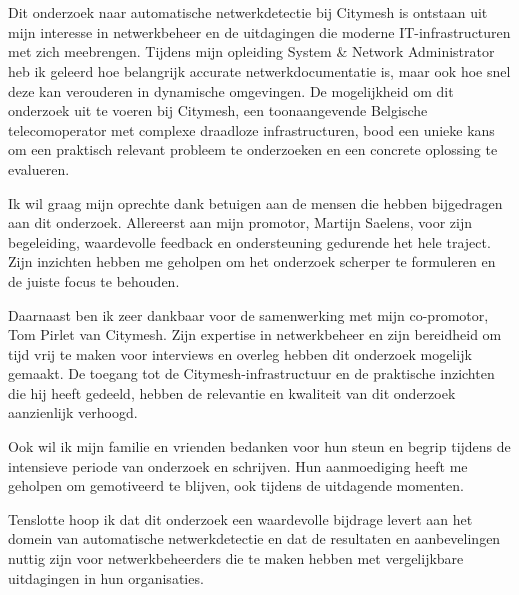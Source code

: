 
\chapter*{}%
\label{ch:voorwoord}

Dit onderzoek naar automatische netwerkdetectie bij Citymesh is ontstaan uit mijn interesse in netwerkbeheer en de uitdagingen die moderne IT-infrastructuren met zich meebrengen. Tijdens mijn opleiding System \& Network Administrator heb ik geleerd hoe belangrijk accurate netwerkdocumentatie is, maar ook hoe snel deze kan verouderen in dynamische omgevingen. De mogelijkheid om dit onderzoek uit te voeren bij Citymesh, een toonaangevende Belgische telecomoperator met complexe draadloze infrastructuren, bood een unieke kans om een praktisch relevant probleem te onderzoeken en een concrete oplossing te evalueren.

Ik wil graag mijn oprechte dank betuigen aan de mensen die hebben bijgedragen aan dit onderzoek. Allereerst aan mijn promotor, Martijn Saelens, voor zijn begeleiding, waardevolle feedback en ondersteuning gedurende het hele traject. Zijn inzichten hebben me geholpen om het onderzoek scherper te formuleren en de juiste focus te behouden.

Daarnaast ben ik zeer dankbaar voor de samenwerking met mijn co-promotor, Tom Pirlet van Citymesh. Zijn expertise in netwerkbeheer en zijn bereidheid om tijd vrij te maken voor interviews en overleg hebben dit onderzoek mogelijk gemaakt. De toegang tot de Citymesh-infrastructuur en de praktische inzichten die hij heeft gedeeld, hebben de relevantie en kwaliteit van dit onderzoek aanzienlijk verhoogd.

Ook wil ik mijn familie en vrienden bedanken voor hun steun en begrip tijdens de intensieve periode van onderzoek en schrijven. Hun aanmoediging heeft me geholpen om gemotiveerd te blijven, ook tijdens de uitdagende momenten.

Tenslotte hoop ik dat dit onderzoek een waardevolle bijdrage levert aan het domein van automatische netwerkdetectie en dat de resultaten en aanbevelingen nuttig zijn voor netwerkbeheerders die te maken hebben met vergelijkbare uitdagingen in hun organisaties.

